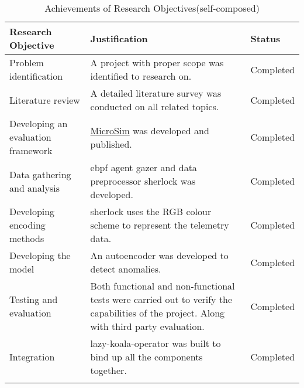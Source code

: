 \begin{longtable}{|p{40mm}|p{91mm}|p{20mm}|}
    \hline
    \textbf{Research Objective} & \textbf{Justification} & \textbf{Status} \\ \hline
    Problem identification & A project with proper scope was identified to research on. & Completed \\ \hline
    Literature review & A detailed literature survey was conducted on all related topics. & Completed \\ \hline
    Developing an evaluation framework & \href{https://github.com/MrSupiri/MicroSim}{MicroSim} was developed and published. & Completed \\ \hline
    Data gathering and analysis & \ac{ebpf} agent \ac{gazer} and data preprocessor \ac{sherlock} was developed. & Completed \\ \hline
    Developing encoding methods & \ac{sherlock} uses the RGB colour scheme to represent the telemetry data. & Completed \\ \hline
    Developing the model & An autoencoder was developed to detect anomalies. & Completed \\ \hline
    Testing and evaluation & Both functional and non-functional tests were carried out to verify the capabilities of the project. Along with third party evaluation. & Completed \\ \hline
    Integration & \ac{lazy-koala-operator} was built to bind up all the components together. & Completed \\ \hline
    \caption{Achievements of Research Objectives(self-composed)}
  \end{longtable}
  
  